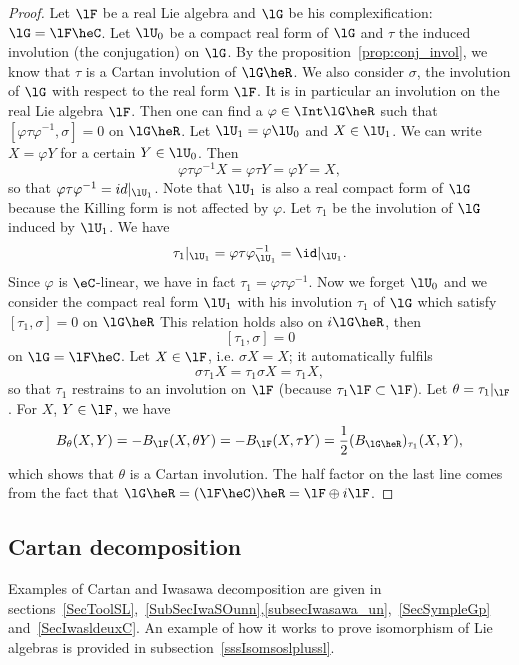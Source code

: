 \begin{proof}
	Let $\lF$ be a real Lie algebra and $\lG$ be his complexification: $\lG=\lF\heC$. Let $\lU_0$ be a compact real form of $\lG$ and $\tau$ the induced involution (the conjugation) on $\lG$. By the proposition~\ref{prop:conj_invol}, we know that $\tau$ is  a Cartan involution of $\lG\heR$. We also consider $\sigma$, the involution of $\lG$ with respect to the real form $\lF$. It is in particular an involution on the real Lie algebra $\lF$. Then one can find a $\varphi\in\Int\lG\heR$ such that $[\varphi\tau\varphi^{-1},\sigma]=0$ on $\lG\heR$. Let $\lU_1=\varphi\lU_0$ and $X\in\lU_1$. We can write $X=\varphi Y$ for a certain $Y\in\lU_0$. Then
	\[
		\varphi\tau\varphi^{-1} X=\varphi\tau Y=\varphi Y=X,
	\]
	so that $\varphi\tau\varphi^{-1}=id|_{\lU_1}$. Note that $\lU_1$ is also a real compact form of $\lG$ because the Killing form is not affected by $\varphi$. Let $\tau_1$ be the involution of $\lG$ induced by $\lU_1$. We have
	\[
		\tau_1|_{\lU_1}=\varphi\tau\varphi^{-1}_{\lU_1}=\id|_{\lU_1}.
	\]
	Since $\varphi$ is $\eC$-linear, we have in fact $\tau_1=\varphi\tau\varphi^{-1}$. Now we forget $\lU_0$ and we consider the compact real form $\lU_1$ with his involution $\tau_1$ of $\lG$ which satisfy $[\tau_1,\sigma]=0$ on $\lG\heR$ This relation holds also on $i\lG\heR$, then
	\[
		[\tau_1,\sigma]=0
	\]
	on $\lG=\lF\heC$. Let $X\in\lF$, i.e. $\sigma X=X$; it automatically fulfils
	\[
		\sigma\tau_1 X=\tau_1\sigma X=\tau_1 X,
	\]
	so that $\tau_1$ restrains to an involution on $\lF$ (because $\tau_1\lF\subset\lF$). Let $\theta=\tau_1|_{\lF}$. For $X$, $Y\in\lF$, we have
	\begin{equation}
		B_{\theta}(X,Y)=-B_{\lF}(X, \theta Y)
		=-B_{\lF}(X,\tau Y)
		=\frac{1}{2}(B_{\lG\heR})_{\tau_1}(X,Y),
	\end{equation}
	which shows that $\theta$ is a Cartan involution. The half factor on the last line comes from the fact that $\lG\heR=(\lF\heC)\heR=\lF\oplus i\lF$.

\end{proof}

\subsection{Cartan decomposition}

Examples of Cartan and Iwasawa decomposition are given in sections~\ref{SecToolSL},~\ref{SubSecIwaSOunn},\ref{subsecIwasawa_un},~\ref{SecSympleGp} and~\ref{SecIwasldeuxC}. An example of how it works to prove isomorphism of Lie algebras is provided in subsection~\ref{sssIsomsoslplussl}.

